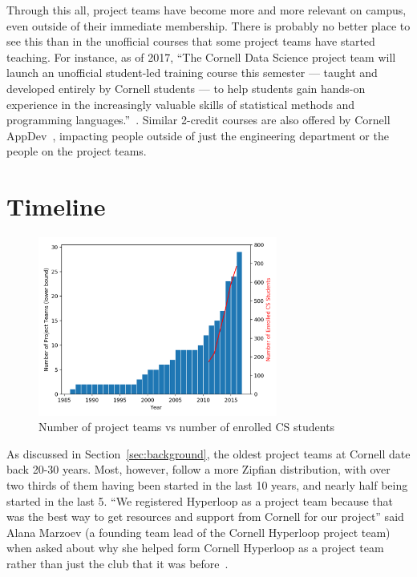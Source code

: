 \documentclass[12pt]{article}
\begin{document}
Through this all, project teams have become more and more relevant on campus, even outside of their immediate membership.
There is probably no better place to see this than in the unofficial courses that some project teams have started teaching.
For instance, as of 2017, ``The Cornell Data Science project team will launch an unofficial student-led training course this semester — taught and developed entirely by Cornell students — to help students gain hands-on experience in the increasingly valuable skills of statistical methods and programming languages.''~\cite{si_cornell_2017}.
Similar 2-credit courses are also offered by Cornell AppDev~\cite{noauthor_cornell_2018-5}, impacting people outside of just the engineering department or the people on the project teams.

\section{Timeline}
\label{sec:timeline}

\begin{figure}
  \center
  \includegraphics[width=0.7\textwidth]{teams-vs-cs}
  \caption{Number of project teams vs number of enrolled CS students~\cite{snabes_computer_2016}}
  \label{fig:teamcount}
\end{figure}

As discussed in Section~\ref{sec:background}, the oldest project teams at Cornell date back 20-30 years.
Most, however, follow a more Zipfian distribution, with over two thirds of them having been started in the last 10 years, and nearly half being started in the last 5.
``We registered Hyperloop as a project team because that was the best way to get resources and support from Cornell for our project'' said Alana Marzoev (a founding team lead of the Cornell Hyperloop project team) when asked about why she helped form Cornell Hyperloop as a project team rather than just the club that it was before~\cite{marzoev_rationale_2018}.
\end{document}
